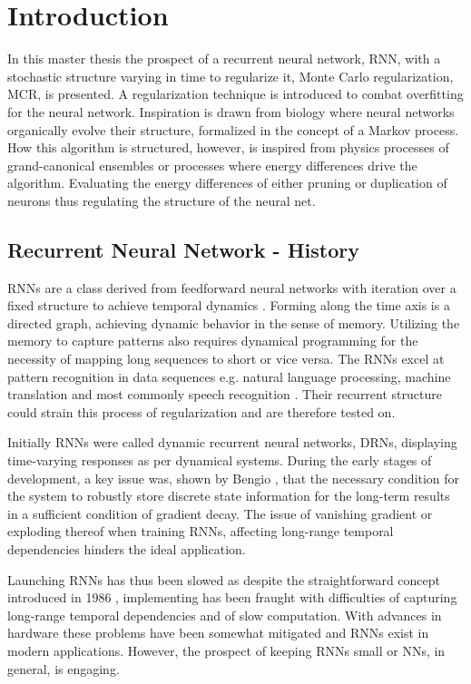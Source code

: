 
\chapter{Introduction}

In this master thesis the prospect of a recurrent neural network, RNN, with a stochastic structure varying in time to regularize it, Monte Carlo regularization, MCR, is presented. A regularization technique is introduced to combat overfitting for the neural network. Inspiration is drawn from biology where neural networks organically evolve their structure, formalized in the concept of a Markov process. How this algorithm is structured, however, is inspired from physics processes of grand-canonical ensembles or processes where energy differences drive the algorithm. Evaluating the energy differences of either pruning or duplication of neurons thus regulating the structure of the neural net.

\section{Recurrent Neural Network - History}

RNNs are a class derived from feedforward neural networks with iteration over a fixed structure to achieve temporal dynamics \cite{DRNNS}. Forming along the time axis is a directed graph, achieving dynamic behavior in the sense of memory. Utilizing the memory to capture patterns also requires dynamical programming for the necessity of mapping long sequences to short or vice versa. The RNNs excel at pattern recognition in data sequences e.g. natural language processing, machine translation and most commonly speech recognition \cite{handwriting}. Their recurrent structure could strain this process of regularization and are therefore tested on.

Initially RNNs were called dynamic recurrent neural networks, DRNs, displaying time-varying responses as per dynamical systems. During the early stages of development, a key issue was, shown by Bengio \cite{ben}, that the necessary condition for the system to robustly store discrete state information for the long-term results in a sufficient condition of gradient decay. The issue of vanishing gradient \cite{hoch} or exploding thereof when training RNNs, affecting long-range temporal dependencies hinders the ideal application. 

Launching RNNs has thus been slowed as despite the straightforward concept introduced in 1986 \cite{RNN1}, implementing has been fraught with difficulties of capturing long-range temporal dependencies and of slow computation. With advances in hardware these problems have been somewhat mitigated and RNNs exist in modern applications. However, the prospect of keeping RNNs small or NNs, in general, is engaging.

